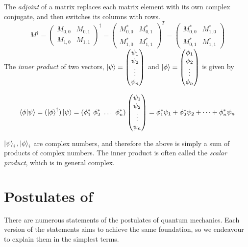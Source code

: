 \begin{itemize}
The \textit{adjoint} of a matrix replaces each matrix element with its own complex conjugate, and then switches its columns with rows.
    \begin{equation}
    M^{\dag} = \begin{pmatrix}
    M_{0,0} & M_{0,1} \\ M_{1,0} & M_{1,1} \end{pmatrix}  ^{\dag} = 
    \begin{pmatrix}
    M_{0,0}^* & M_{0,1}^* \\ M_{1,0}^* & M_{1,1}^* \end{pmatrix} ^T = 
    \begin{pmatrix}
    M_{0,0}^* & M_{1,0}^* \\ M_{0,1}^* & M_{1,1}^* \end{pmatrix}
    \end{equation}
The \textit{inner product} of two vectors, $\ket{\psi} = \left(\begin{matrix}\psi_1 \\ \psi_2 \\ \vdots \\ \psi_n\end{matrix}\right)$ and $\ket{\phi}= \left(\begin{matrix}\phi_1 \\ \phi_2 \\ \vdots \\ \phi_n \end{matrix}\right)$ is given by 

    \begin{equation}
    \braket{\phi | \psi} = (\ket{\phi}^{\dag})\ket{\psi}
    = (\phi_1^* \ \phi_2^* \ \hdots \ \phi_n^*) \left(\begin{matrix}\psi_1 \\ \psi_2 \\ \vdots \\ \psi_n\end{matrix}\right)
    = \phi_1^* \psi_1 + \phi_2^* \psi_2 + \dots + \phi_n^* \psi_n
    \end{equation}

$\ket{\psi}_i, \ket{\phi}_i$ are complex numbers, and therefore the above is simply a sum of products of complex numbers. 
The inner product is often called the \emph{scalar product}, which is in general complex.

\end{itemize}


\section{Postulates of }\label{sec:postulates}

There are numerous statements of the postulates of quantum mechanics. 
Each version of the statements aims to achieve the same foundation, so we endeavour to explain them in the simplest terms. 

